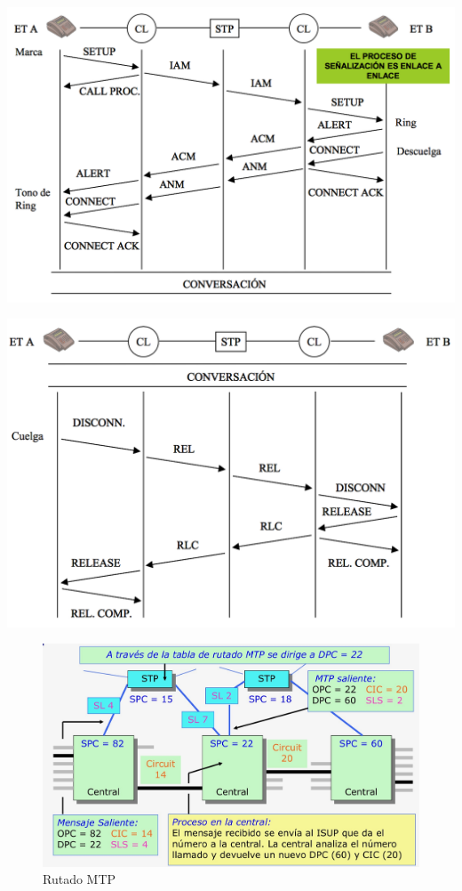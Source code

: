 \documentclass[10pt,portrait, twocolumn]{article}
\begin{document}
	\begin{center}
		\includegraphics[scale = 0.3]{ej1}
	\end{center}
	
	\begin{center}
		\includegraphics[scale = 0.3]{ej2}
	\end{center}	

	\begin{figure}[!ht]
 		\centering
  		 \includegraphics[scale = 0.15]{Rutado}
		\caption{Rutado MTP}
	\end{figure}	
\end{document}
